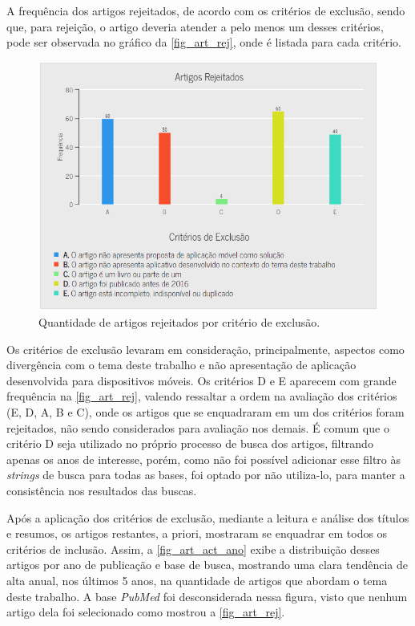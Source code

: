 \newpage

A frequência dos artigos rejeitados, de acordo com os critérios de exclusão, sendo que, para rejeição, o artigo deveria atender a pelo menos um desses critérios, pode ser observada no gráfico da \autoref{fig_art_rej}, onde é listada para cada critério.

\begin{figure}[htb]
  \caption{\label{fig_art_rej}Quantidade de artigos rejeitados por critério de exclusão.}
  \begin{center}
    \includegraphics[scale=0.6]{Imagens/msl/artigos_rejeitados.png}
  \end{center}
\end{figure}

Os critérios de exclusão levaram em consideração, principalmente, aspectos como divergência com o tema deste trabalho e não apresentação de aplicação desenvolvida para dispositivos móveis.
Os critérios D e E aparecem com grande frequência na \autoref{fig_art_rej}, valendo ressaltar a ordem na avaliação dos critérios (E, D, A, B e C), onde os artigos que se enquadraram em um dos critérios foram rejeitados, não sendo considerados para avaliação nos demais.
É comum que o critério D seja utilizado no próprio processo de busca dos artigos, filtrando apenas os anos de interesse, porém, como não foi possível adicionar esse filtro às \emph{strings} de busca para todas as bases, foi optado por não utiliza-lo, para manter a consistência nos resultados das buscas.

Após a aplicação dos critérios de exclusão, mediante a leitura e análise dos títulos e resumos, os artigos restantes, a priori, mostraram se enquadrar em todos os critérios de inclusão.
Assim, a \autoref{fig_art_act_ano} exibe a distribuição desses artigos por ano de publicação e base de busca, mostrando uma clara tendência de alta anual, nos últimos 5 anos, na quantidade de artigos que abordam o tema deste trabalho.
A base \emph{PubMed} foi desconsiderada nessa figura, visto que nenhum artigo dela foi selecionado como mostrou a \autoref{fig_art_rej}.


